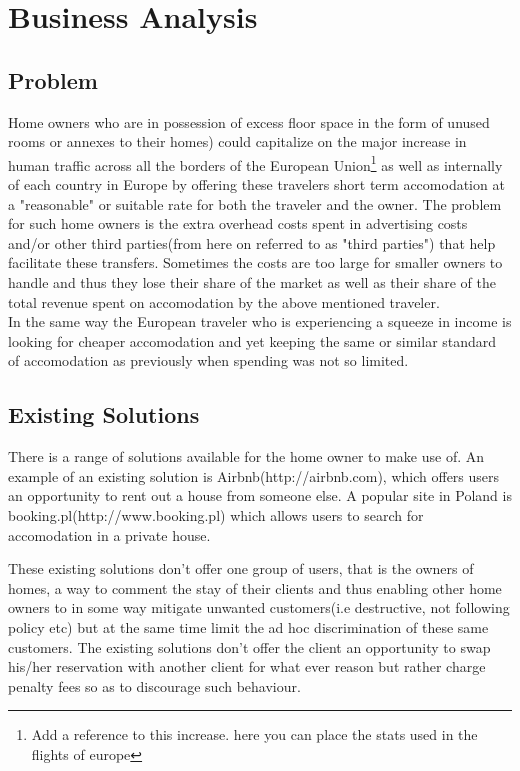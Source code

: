 \chapter{Business Analysis}
\section{Problem}
Home owners who are in possession of excess floor space in the form of unused rooms or annexes to their homes) could capitalize on the major increase in human traffic across all the borders of the European Union\footnote{Add a reference to this increase. here you can place the stats used in the flights of europe} as well as internally of each country in Europe by offering these travelers short term accomodation at a "reasonable" or suitable rate for both the traveler and the owner. The problem for such home owners is the extra overhead costs spent in advertising costs and/or other third parties(from here on referred to as "third parties") that help facilitate these transfers. Sometimes the costs are too large for smaller owners to handle and thus they lose their share of the market as well as their share of the total revenue spent on accomodation by the above mentioned traveler.\\
In the same way the European traveler who is experiencing a squeeze in income is looking for cheaper accomodation and yet keeping the same or similar standard of accomodation as previously when spending was not so limited. 

\section{Existing Solutions}
There is a range of solutions available for the home owner to make use of. An example of an existing solution is Airbnb(http://airbnb.com), which offers users an opportunity to rent out a house from someone else. A popular site in Poland is booking.pl(http://www.booking.pl) which allows users to search for accomodation in a private house. 

These existing solutions don't offer one group of users, that is the owners of homes, a way to comment the stay of their clients and thus enabling other home owners to in some way mitigate unwanted customers(i.e destructive, not following policy etc) but at the same time limit the ad hoc discrimination of these same customers. The existing solutions don't offer the client an opportunity to swap his/her reservation with another client for what ever reason but rather charge penalty fees so as to discourage such behaviour. 

